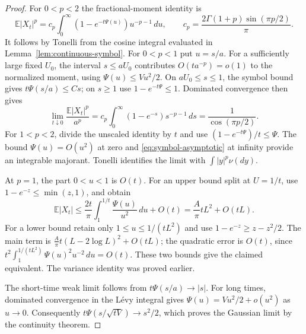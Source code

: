 \begin{proof}
For $0<p<2$ the fractional-moment identity is
\[
 \mathbb E|X_t|^p
 =c_p\int_0^\infty(1-e^{-t\Psi(u)})u^{-p-1}\,du,
 \qquad c_p=\frac{2\Gamma(1+p)\sin(\pi p/2)}\pi.
\]
It follows by Tonelli from the cosine integral evaluated in
Lemma~\ref{lem:continuous-symbol}. For $0<p<1$ put $u=s/a$.
For a sufficiently large fixed $U_0$, the interval $s\leq aU_0$
contributes $O(t a^{-p})=o(1)$ to the normalized moment, using
$\Psi(u)\leq Vu^2/2$. On $aU_0\leq s\leq1$, the symbol bound gives
$t\Psi(s/a)\leq Cs$; on $s\geq1$ use $1-e^{-t\Psi}\leq1$.
Dominated convergence then gives
\[
 \lim_{t\downarrow0}\frac{\mathbb E|X_t|^p}{a^p}
 =c_p\int_0^\infty(1-e^{-s})s^{-p-1}\,ds
 =\frac1{\cos(\pi p/2)}.
\]
For $1<p<2$, divide the unscaled identity by $t$ and use
$(1-e^{-t\Psi})/t\leq\Psi$. The bound
$\Psi(u)=O(u^2)$ at zero and \eqref{eq:symbol-asymptotic} at infinity
provide an integrable majorant. Tonelli identifies the limit with
$\int|y|^p\nu(dy)$.

At $p=1$, the part $0<u<1$ is $O(t)$. For an upper bound split at
$U=1/t$, use $1-e^{-z}\leq\min(z,1)$, and obtain
\[
 \mathbb E|X_t|
 \leq \frac{2t}\pi\int_1^{1/t}\frac{\Psi(u)}{u^2}\,du+O(t)
 =\frac A\pi tL^2+O(tL).
\]
For a lower bound retain only $1\leq u\leq1/(tL^2)$ and use
$1-e^{-z}\geq z-z^2/2$. The main term is
$\frac A\pi t(L-2\log L)^2+O(tL)$; the quadratic error is $O(t)$,
since $t^2\int_1^{1/(tL^2)}\Psi(u)^2u^{-2}\,du=O(t)$.
These two bounds give the claimed equivalent. The variance identity
was proved earlier.

The short-time weak limit follows from
$t\Psi(s/a)\to|s|$. For long times, dominated convergence in the
L\'evy integral gives $\Psi(u)=Vu^2/2+o(u^2)$ as $u\to0$.
Consequently $t\Psi(s/\sqrt{tV})\to s^2/2$, which proves the
Gaussian limit by the continuity theorem.
\end{proof}

